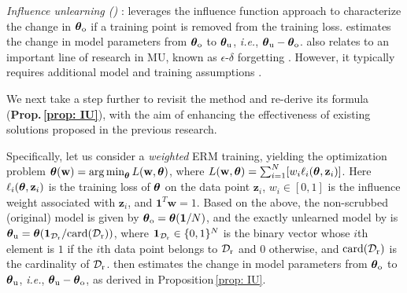 \noindent {} \textit{Influence unlearning (\textbf{\IU})} \cite{koh2017understanding,izzo2021approximate}:
{\IU} leverages the influence function approach \cite{cook1982residuals} to characterize the change in  $\boldsymbol \theta_\mathrm{o}$  if a training point is removed from the training loss. {\IU} estimates the change in model parameters from $\boldsymbol \theta_\mathrm{o}$ to $\boldsymbol \theta_\mathrm{u}$, \textit{i.e.}, $\boldsymbol \theta_\mathrm{u} - \boldsymbol \theta_\mathrm{o}$.  {{\IU} also relates to an important line of research in MU, known as $\epsilon$-$\delta$ forgetting \cite{wang2022federated,guo2019certified,xu2023machine}. However, it typically requires additional model and training assumptions \cite{guo2019certified}. 
}

We next take a step further to revisit the {\IU} method and re-derive its formula (\textbf{Prop.\,\ref{prop: IU}}), with the aim of enhancing the effectiveness of existing  solutions proposed in the previous research.

\iffalse
Specifically, let us consider a \textit{weighted} ERM training, yielding   the optimization problem $\boldsymbol{\theta}(\mathbf w) = \operatorname*{arg\,min}_{\boldsymbol{\theta}} L(\mathbf w, \boldsymbol{\theta})$, where $L(\mathbf w, \boldsymbol{\theta}) = \sum_{i=1}^N [w_i \ell_i (\boldsymbol{\theta}, \mathbf z_i)]$. 
Here
$\ell_i (\boldsymbol{\theta}, \mathbf z_i)$ is the training loss of $\boldsymbol{\theta}$  on the data point $\mathbf z_i$,   $w_i \in [0,1]$ is the influence weight associated with $\mathbf z_i$, and $\mathbf 1^T \mathbf w = 1$.
Based on the above, the non-scrubbed (original) model  is   given by $\boldsymbol \theta_\mathrm{o} = \boldsymbol{\theta}(\mathbf 1/N)$,  and the exactly unlearned model by {\retrain} is  $\boldsymbol \theta_\mathrm{u} = \boldsymbol{\theta}(\mathbf{1}_{\mathcal D_\mathrm{r}}/\mathrm{card}(\mathcal D_\mathrm{r}))$, 
where $\mathbf{1}_{\mathcal D_\mathrm{r}}\in\mathbb \{ 0,1\}^N$  is the binary vector whose $i$th element is $1$ if the $i$th data point belongs to $\mathcal D_\mathrm{r}$ and $0$ otherwise, and $\mathrm{card}(\mathcal D_\mathrm{r})$ is the cardinality of $\mathcal D_\mathrm{r}$.   {\IU} then  estimates the change in model parameters from $\boldsymbol \theta_\mathrm{o}$ to $\boldsymbol \theta_\mathrm{u}$, \textit{i.e.}, $\boldsymbol \theta_\mathrm{u} - \boldsymbol \theta_\mathrm{o}$, as derived in Proposition\,\ref{prop: IU}.

